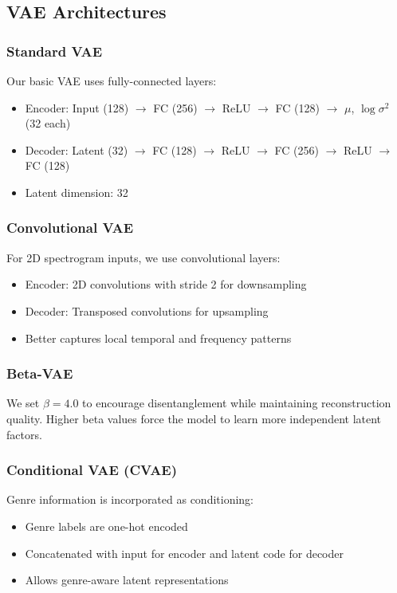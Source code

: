 \documentclass{article}
\begin{document}
\subsection{VAE Architectures}

\subsubsection{Standard VAE}
Our basic VAE uses fully-connected layers:
\begin{itemize}
    \item Encoder: Input (128) $\rightarrow$ FC (256) $\rightarrow$ ReLU $\rightarrow$ FC (128) $\rightarrow$ $\mu$, $\log\sigma^2$ (32 each)
    \item Decoder: Latent (32) $\rightarrow$ FC (128) $\rightarrow$ ReLU $\rightarrow$ FC (256) $\rightarrow$ ReLU $\rightarrow$ FC (128)
    \item Latent dimension: 32
\end{itemize}

\subsubsection{Convolutional VAE}
For 2D spectrogram inputs, we use convolutional layers:
\begin{itemize}
    \item Encoder: 2D convolutions with stride 2 for downsampling
    \item Decoder: Transposed convolutions for upsampling
    \item Better captures local temporal and frequency patterns
\end{itemize}

\subsubsection{Beta-VAE}
We set $\beta = 4.0$ to encourage disentanglement while maintaining reconstruction quality. Higher beta values force the model to learn more independent latent factors.

\subsubsection{Conditional VAE (CVAE)}
Genre information is incorporated as conditioning:
\begin{itemize}
    \item Genre labels are one-hot encoded
    \item Concatenated with input for encoder and latent code for decoder
    \item Allows genre-aware latent representations
\end{itemize}
\end{document}
